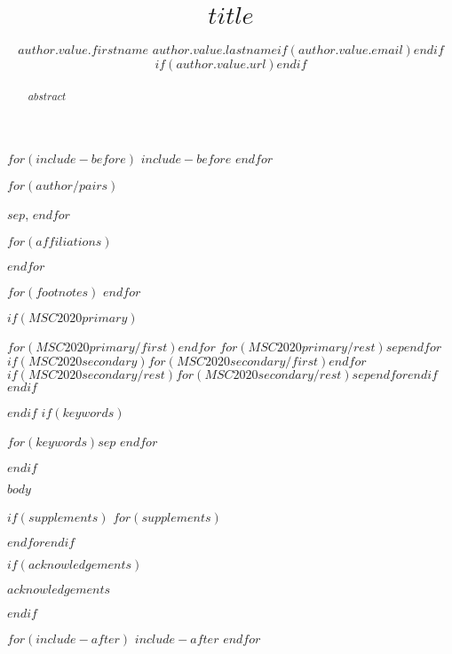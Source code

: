 \documentclass[$for(classoption)$$classoption$$sep$,$endfor$]{imsart}
\numberwithin{equation}{section}
\theoremstyle{plain}
\begin{document}
$for(include-before)$
$include-before$
$endfor$
\begin{frontmatter}

\title{$title$}

\begin{aug}
$for(author/pairs)$
\author{$author.value.firstname$ $author.value.lastname$$if(author.value.email)$$endif$$if(author.value.url)$$endif$}$sep$, $endfor$


$for(affiliations)$ %
\address[$affiliations.ref$]{$affiliations.name$, $affiliations.address$ $for(author/pairs)$
$if(it.value.email)$
\ifstrequal{$affiliations.ref$}{$it.value.affiliationref$}{\printead{ea-$it.key$}}{}
$endif$
$if(it.value.url)$
\ifstrequal{$affiliations.ref$}{$it.value.affiliationref$}{\printead{ua-$it.key$}}{}
$endif$
$sep$ $endfor$%
}$endfor$%

$for(footnotes)$
$endfor$

\end{aug}

\begin{abstract}
$abstract$
\end{abstract}

$if(MSC2020primary)$ \begin{keyword}[class=MSC]
$for(MSC2020primary/first)$$endfor$
$for(MSC2020primary/rest)$$sep $$endfor$
$if(MSC2020secondary)$$for(MSC2020secondary/first)$$endfor$
$if(MSC2020secondary/rest)$$for(MSC2020secondary/rest)$$sep $$endfor$$endif$$endif$\end{keyword}$endif$
$if(keywords)$ \begin{keyword} $for(keywords)$$sep$ $endfor$\end{keyword}$endif$
\end{frontmatter}

$body$

$if(supplements)$
$for(supplements)$
\begin{supplement}
\end{supplement}
$endfor$$endif$

$if(acknowledgements)$
\begin{acks}[Acknowledgments]
$acknowledgements$
\end{acks}
$endif$




$for(include-after)$
$include-after$
$endfor$
\end{document}
